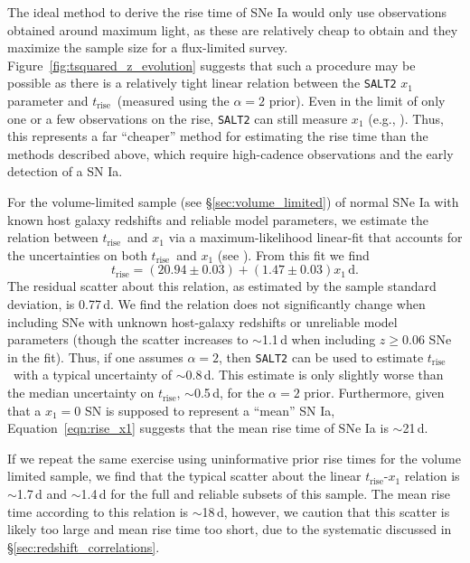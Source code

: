 \documentclass[twocolumn]{./aastex63}
\newcommand{\trise}{$t_\mathrm{rise}$}
\begin{document}
The ideal method to derive the rise time of SNe Ia would only use observations
obtained around maximum light, as these are relatively cheap to obtain and they
maximize the sample size for a flux-limited survey.
Figure~\ref{fig:tsquared_z_evolution} suggests that such a procedure may be
possible as there is a relatively tight linear relation between the
\texttt{SALT2} $x_1$ parameter and \trise\ (measured using the $\alpha = 2$
prior). Even in the limit of only one or a few observations on the rise,
\texttt{SALT2} can still measure $x_1$ (e.g., \citealt{Scolnic18a}). Thus, this
represents a far ``cheaper'' method for estimating the rise time than the
methods described above, which require high-cadence observations and the early
detection of a SN Ia.

For the volume-limited sample (see \S\ref{sec:volume_limited}) of normal SNe Ia
with known host galaxy redshifts and reliable model parameters, we estimate the
relation between \trise\ and $x_1$ via a maximum-likelihood linear-fit that
accounts for the uncertainties on both \trise\ and $x_1$ (see \citealt{Hogg10}).
From this fit we find
%
\begin{equation}
    t_\mathrm{rise} = (20.94 \pm 0.03) + (1.47 \pm 0.03)x_1\,\mathrm{d}.
    \label{eqn:rise_x1}
\end{equation} 
%
The residual scatter about this relation, as estimated by the sample standard
deviation, is 0.77\,d. We find the relation does not significantly change when
including SNe with unknown host-galaxy redshifts or unreliable model parameters
(though the scatter increases to $\sim$1.1\,d when including $z \ge 0.06$ SNe in
the fit). Thus, if one assumes $\alpha = 2$, then \texttt{SALT2} can be used to
estimate \trise\ with a typical uncertainty of $\sim$0.8\,d. This estimate is
only slightly worse than the median uncertainty on \trise, $\sim$0.5\,d, for the
$\alpha = 2$ prior. Furthermore, given that a $x_1 = 0$ SN is supposed to
represent a ``mean'' SN Ia, Equation~\ref{eqn:rise_x1} suggests that the mean
rise time of SNe Ia is $\sim$21\,d.

If we repeat the same exercise using uninformative prior rise times for the
volume limited sample, we find that the typical scatter about the linear
\trise-$x_1$ relation is $\sim$1.7\,d and $\sim$1.4\,d for the full and reliable
subsets of this sample. The mean rise time according to this relation is
$\sim$18\,d, however, we caution that this scatter is likely too large and mean
rise time too short, due to the systematic discussed in
\S\ref{sec:redshift_correlations}.
\end{document}
